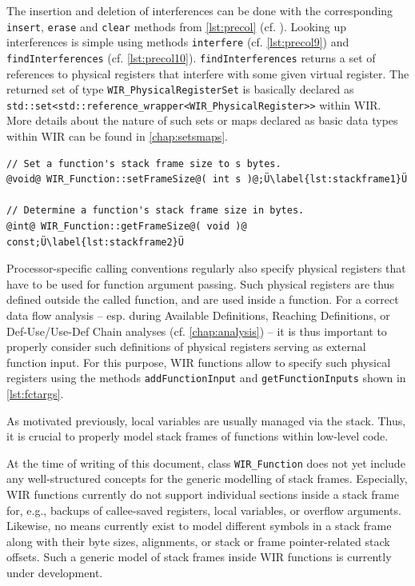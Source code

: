The insertion and deletion of interferences can be done with the corresponding \texttt{insert}, \texttt{erase} and \texttt{clear} methods from \cref{lst:precol} (cf. ).
Looking up interferences is simple using methods \texttt{interfere} (cf. \cref{lst:precol9}) and \texttt{findInterferences} (cf. \cref{lst:precol10}).
\texttt{findInterferences} returns a set of references to physical registers that interfere with some given virtual register.
The returned set of type \texttt{WIR\_PhysicalRegisterSet} is basically declared as \texttt{std::set<std::reference\_wrapper<WIR\_PhysicalRegister>{}>} within \gls{WIR}.
More details about the nature of such sets or maps declared as basic data types within \gls{WIR} can be found in \cref{chap:setsmaps}.

\begin{lstlisting}[style=code,float=h,caption={Stack Frame Handling of Class \texttt{WIR\_Function}},label=lst:stackframe]
// Set a function's stack frame size to s bytes.
@void@ WIR_Function::setFrameSize@( int s )@;Ü\label{lst:stackframe1}Ü

// Determine a function's stack frame size in bytes.
@int@ WIR_Function::getFrameSize@( void )@ const;Ü\label{lst:stackframe2}Ü
\end{lstlisting}

Processor-specific calling conventions regularly also specify physical registers that have to be used for function argument passing.
Such physical registers are thus defined outside the called function, and are used inside a function.
For a correct data flow analysis -- esp. during Available Definitions, Reaching Definitions, or Def-Use/Use-Def Chain analyses (cf. \cref{chap:analysis}) -- it is thus important to properly consider such definitions of physical registers serving as external function input.
For this purpose, \gls{WIR} functions allow to specify such physical registers using the methods \texttt{addFunctionInput} and \texttt{getFunctionInputs} shown in \cref{lst:fctargs}.

As motivated previously, local variables are usually managed via the stack.
Thus, it is crucial to properly model stack frames of functions within low-level code.

\begin{wirFutureWork}\label{fw:stackframe}
At the time of writing of this document, class \texttt{WIR\_Function} does not yet include any well-structured concepts for the generic modelling of stack frames.
Especially, \gls{WIR} functions currently do not support individual sections inside a stack frame for, e.g., backups of callee-saved registers, local variables, or overflow arguments.
Likewise, no means currently exist to model different symbols in a stack frame along with their byte sizes, alignments, or stack or frame pointer-related stack offsets.
Such a generic model of stack frames inside \gls{WIR} functions is currently under development.
\end{wirFutureWork}

